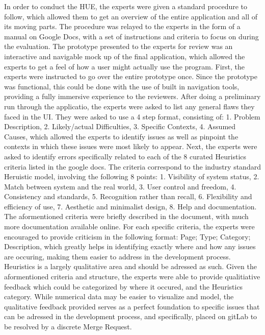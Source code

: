 \documentclass[sigconf]{acmart}
\begin{document}
    In order to conduct the HUE, the experts were given a standard procedure to follow, which allowed them to get an overview of the entire application and all of its moving parts. The procedure was relayed to the experts in the form of a manual on Google Docs, with a set of instructions and criteria to focus on during the evaluation. The prototype presented to the experts for review was an interactive and navigable mock up of the final application, which allowed the experts to get a feel of how a user might actually use the program.
    First, the experts were instructed to go over the entire prototype once. Since the prototype was functional, this could be done with the use of built in navigation tools, providing a fully immersive experience to the reviewers. After doing a preliminary run through the applicatio, the experts were asked to list any general flaws they faced in the UI. They were asked to use a 4 step format, consisting of: 1. Problem Description, 2. Likely/actual Difficulties, 3. Specific Contexts, 4. Assumed Causes, which allowed the experts to identify issues as well as pinpoint the contexts in which these issues were most likely to appear. 
    Next, the experts were asked to identify errors specifically related to each of the 8 curated Heuristics criteria listed in the google docs. The criteria correspond to the industry standard Heruistic model, involving the following 8 points: 1. Visibility of system status, 2. Match between system and the real world, 3. User control and freedom, 4. Consistency and standards, 5. 
Recognition rather than recall, 6. Flexibility and efficiency of use, 7. Aesthetic and minimalist design, 8. Help and documentation. The aformentioned criteria were briefly described in the document, with much more documentation available online. For each specific criteria, the experts were encouraged to provide criticism in the following format: Page; Type; Category; Description, which greatly helps in identifying exactly where and how any issues are occuring, making them easier to address in the development process. 
    Heuristics is a largely qualitative area and should be adressed as such. Given the aformentioned criteria and structure, the experts were able to provide qualitiative feedback which could be categorized by where it occured, and the Heuristics category. While numerical data may be easier to visualize and model, the qualitative feedback provided serves as a perfect foundation to specific issues that can be adressed in the development process, and specifically, placed on gitLab to be resolved by a discrete Merge Request.










\end{document}
